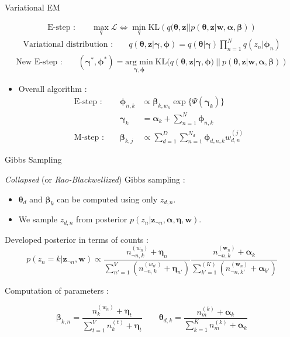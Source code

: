 \documentclass{beamer}
\begin{document}
\begin{frame}{Variational EM}

\begin{align*}
\text{E-step : } && \max_{q}\mathcal{L} \Leftrightarrow \min_q \mathrm{KL} \left( q(\bm{\theta}, \mathbf{z} || p(\bm{\theta}, \mathbf{z}| \mathbf{w}, \bm{\alpha}, \bm{\beta}) \right)
\end{align*}
\begin{align*}
\text{Variational distribution : } && q(\bm{\theta}, \mathbf{z}|\bm{\gamma}, \bm{\phi}) = q(\bm{\theta}|\bm{\gamma})\prod_{n=1}^{N} q(z_n|\bm{\phi}_n)
\end{align*}
\begin{align*}
\text{New E-step : } && (\bm{\gamma}^*, \bm{\phi}^*) = \underset{\bm{\gamma}, \bm{\phi}}{\text{arg min}}\;\mathrm{KL}(q(\bm{\theta}, \mathbf{z} | \bm{\gamma}, \bm{\phi})~||~p(\bm{\theta}, \mathbf{z} | \mathbf{w}, \bm{\alpha}, \bm{\beta}))
\end{align*}
\begin{itemize}
\item Overall algorithm : 
\begin{align*}
\text{E-step : } && \bm{\phi}_{n,k} & \propto \bm{\beta}_{k, w_n} \exp\{\Psi(\bm{\gamma}_k)\} \\
&&  \bm{\gamma}_{k} & = \bm{\alpha}_{k} + \sum_{n=1}^N \bm{\phi}_{n,k} \\
\text{M-step : } && \bm{\beta}_{k,j} & \propto \sum_{d=1}^D \sum_{n=1}^{N_d} \bm{\phi}_{d, n, k}w_{d,n}^{(j)}
\end{align*}
\end{itemize}

\end{frame}

\begin{frame}{Gibbs Sampling}

\textit{Collapsed} (or \textit{Rao-Blackwellized}) Gibbs sampling :
\begin{itemize}
\item $\bm{\theta}_d$ and $\bm{\beta}_k$ can be computed using only $z_{d,n}$.
\item We sample $z_{d,n}$ from posterior $p(z_n|\mathbf{z}_{\neg n}, \bm{\alpha}, \bm{\eta}, \mathbf{w})$.
\end{itemize}
\vspace{0.5cm}
Developed posterior in terms of counts :
\vspace{-0.2cm}
$$
p(z_n=k|\mathbf{z}_{\neg n}, \mathbf{w}) \propto \frac{n_{\neg n,k}^{(w_n)} + \bm{\eta}_n}{\sum_{n'=1}^{V}\left( n_{\neg n, k} ^{(w_{n'})} + \bm{\eta}_{n'}\right)}\frac{n_{\neg n, k} ^{(\mathbf{w}_n)} + \bm{\alpha}_k}{\sum_{k'=1}^{(K)} \left( n_{\neg n, k'} ^{(\mathbf{w}_n)} + \bm{\alpha}_{k'} \right) }
$$

Computation of parameters :

$$
\bm{\beta}_{k,n} = \frac{n_k ^{(w_n)} + \bm{\eta}_{t}}{\sum_{t=1}^{V} n_k ^{(t)} + \bm{\eta}_{t}}
\qquad
\bm{\theta}_{d,k} = \frac{n_m ^{(k)} + \bm{\alpha}_k}{\sum_{k=1}^{K} n_m ^{(k)} + \bm{\alpha}_k}
$$

\end{frame}
\end{document}
